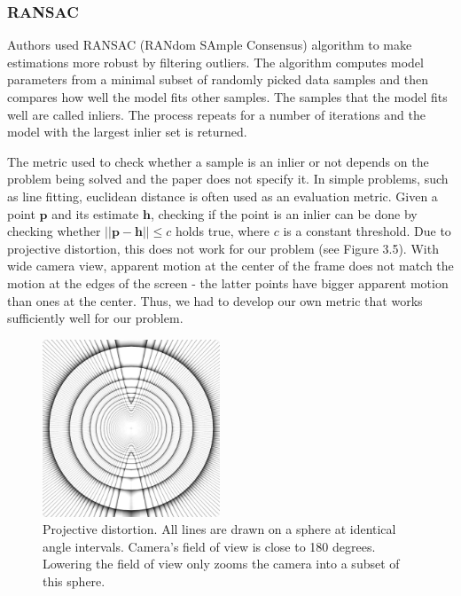 \documentclass[11pt,english]{report}
\begin{document}
\subsubsection{RANSAC}

Authors used RANSAC\cite{FISCHLER1987726} (RANdom SAmple Consensus) algorithm to make estimations more robust by filtering outliers. The algorithm computes model parameters from a minimal subset of randomly picked data samples and then compares how well the model fits other samples. The samples that the model fits well are called inliers. The process repeats for a number of iterations and the model with the largest inlier set is returned.

The metric used to check whether a sample is an inlier or not depends on the problem being solved and the paper does not specify it. In simple problems, such as line fitting, euclidean distance is often used as an evaluation metric. Given a point $\mathbf{p}$ and its estimate $\mathbf{h}$, checking if the point is an inlier can be done by checking whether $||\mathbf{p} - \mathbf{h}|| \leq c$ holds true, where $c$ is a constant threshold. Due to projective distortion, this does not work for our problem (see Figure 3.5). With wide camera view, apparent motion at the center of the frame does not match the motion at the edges of the screen - the latter points have bigger apparent motion than ones at the center. Thus, we had to develop our own metric that works sufficiently well for our problem.

\begin{figure}[!ht]
	\centering
	\includegraphics[width=150pt]{docs/report/distortion.jpg}
	\caption{\centering Projective distortion. All lines are drawn on a sphere at identical angle intervals. Camera's field of view is close to 180 degrees. Lowering the field of view only zooms the camera into a subset of this sphere.}
\end{figure}
\end{document}
